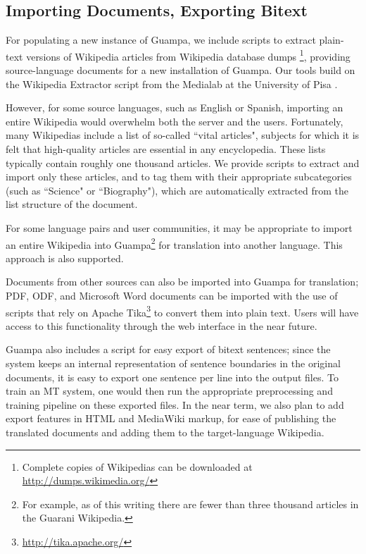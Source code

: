 \documentclass[10pt, a4paper]{article}
\begin{document}
\subsection{Importing Documents, Exporting Bitext}
For populating a new instance of Guampa, we include scripts to extract
plain-text versions of Wikipedia articles from Wikipedia database dumps
\footnote{Complete copies of Wikipedias can be downloaded at \\
\url{http://dumps.wikimedia.org/}}, providing source-language documents for a
new installation of Guampa. Our tools build on the Wikipedia Extractor
script from the Medialab at the University of Pisa \cite{pisa-wp-extractor}.

However, for some source languages, such as English or Spanish, importing an
entire Wikipedia would overwhelm both the server and the users. Fortunately,
many Wikipedias include a list of so-called ``vital articles", subjects for
which it is felt that high-quality articles are essential in any encyclopedia.
These lists typically contain roughly one thousand articles. We provide scripts
to extract and import only these articles, and to tag them with their
appropriate subcategories (such as ``Science" or ``Biography"), which are
automatically extracted from the list structure of the document.

For some language pairs and user communities, it may be appropriate to import
an entire Wikipedia into Guampa\footnote{
For example, as of this writing there are fewer than three thousand
articles in the Guarani Wikipedia.}
for translation into another language. This approach is also supported.

Documents from other sources can also be imported into Guampa for translation;
PDF, ODF, and Microsoft Word documents can be imported with the use of scripts
that rely on Apache Tika\footnote{\url{http://tika.apache.org/}}
to convert them into plain text. Users will have
access to this functionality through the web interface in the near future.

Guampa also includes a script for easy export of bitext sentences; since the
system keeps an internal representation of sentence boundaries in the original
documents, it is easy to export one sentence per line into the output files. To
train an MT system, one would then run the appropriate preprocessing and
training pipeline on these exported files. In the near term, we also plan to
add export features in HTML and MediaWiki markup, for ease of publishing the
translated documents and adding them to the target-language Wikipedia.
\end{document}
